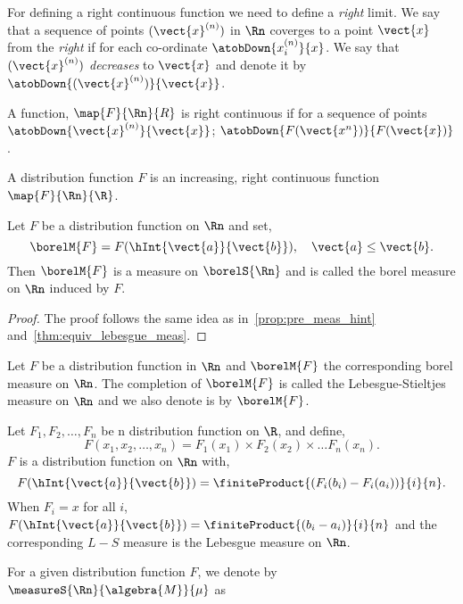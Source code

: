 For defining a right continuous function we need to define a \emph{right} limit. We say that a
sequence of points $(\vect{x}^{(n)})$ in $\Rn$ coverges to a point $\vect{x}$ from the \emph{right}
if for each co-ordinate $\atobDown{x_i^{(n)}}{x}$. We say that  $(\vect{x}^{(n)})$ \emph{decreases}
to $\vect{x}$ and denote it by $\atobDown{(\vect{x}^{(n)})}{\vect{x}}$.
\begin{Definition}[name=Right continuous function in $\Rn$]
    A function, $\map{F}{\Rn}{R}$ is right continuous if for a sequence of points 
    $\atobDown{\vect{x}^{(n)}}{\vect{x}}$; $\atobDown{F(\vect{x^{n}})}{F(\vect{x})}$.
\end{Definition}
\begin{Definition}[name=Distribution function in $\Rn$]
    A distribution function $F$ is an increasing, right continuous function $\map{F}{\Rn}{\R}$.
\end{Definition}
\begin{Theorem}[name=Borel measure in $\Rn$]\label{thm:borel_meas_rn}
    Let $F$ be a distribution function on $\Rn$ and set,
    \[\borelM{F} = F(\hInt{\vect{a}}{\vect{b}}),\quad \vect{a}\leq\vect{b}.\]
    Then $\borelM{F}$ is a measure on $\borelS{\Rn}$ and is called the borel measure on $\Rn$
    induced by $F$.
\end{Theorem}
\begin{proof}
    The proof follows the same idea as in~\ref{prop:pre_meas_hint}
    and~\ref{thm:equiv_lebesgue_meas}.
\end{proof}
\begin{Definition}[name=Lebesgue-Stieltjes (L-S) measure on $\Rn$]
    Let $F$ be a distribution function in $\Rn$ and $\borelM{F}$ the corresponding borel measure on
    $\Rn$. The completion of $\borelM{F}$ is called the Lebesgue-Stieltjes measure on $\Rn$ and we
    also denote is by $\borelM{F}$.
\end{Definition}
\begin{Example}
    Let $F_1,F_2,\dots,F_n$ be n distribution function on $\R$, and define,
    \[F(x_1,x_2,\dots,x_n) = F_1(x_1)\times F_2(x_2)\times\dots F_n(x_n).\]
    $F$ is a distribution function on $\Rn$ with,
    \[F(\hInt{\vect{a}}{\vect{b}}) = \finiteProduct{(F_i(b_i)-F_i(a_i))}{i}{n}.\]
    When $F_i = x$ for all $i$, $F(\hInt{\vect{a}}{\vect{b}}) = \finiteProduct{(b_i-a_i)}{i}{n}$ and
    the corresponding $L-S$ measure is the Lebesgue measure on $\Rn$.
\end{Example}
For a given distribution function $F$, we denote by $\measureS{\Rn}{\algebra{M}}{\mu}$ as
